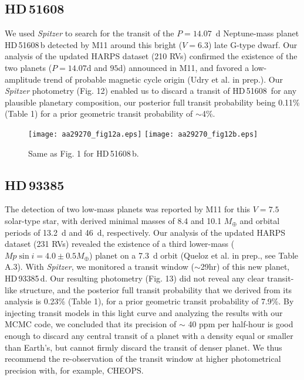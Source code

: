 \documentclass[traditabstract]{aa}
\begin{document}
\subsection{HD\,51608}

We used {\it Spitzer} to search for the transit of the $P=14.07$~d Neptune-mass planet HD\,51608\,b detected by M11
around this bright ($V=6.3$) late G-type dwarf. Our analysis of the updated HARPS dataset (210 RVs) confirmed the 
existence of the two planets ($P=14.07$d and $95$d) announced in M11, and favored a low-amplitude trend
of probable magnetic cycle origin (Udry et al. in prep.). Our {\it Spitzer} photometry (Fig. 12) enabled us to discard a 
transit of HD\,51608\, for any plausible planetary composition, our posterior full transit probability being 0.11\% (Table 1) for a
 prior geometric transit probability of $\sim$4\%.


\begin{figure}
\label{fig:13}
\centering                     
\texttt{[image: aa29270\_fig12a.eps]}
\texttt{[image: aa29270\_fig12b.eps]}
\caption{Same as Fig. 1 for  HD\,51608\,b.}
\end{figure}

\subsection{HD\,93385}

The detection of two low-mass planets was reported by M11 for this $V=7.5$ solar-type star, with derived minimal masses of 8.4 and 10.1 $M_\oplus$ and orbital periods of 13.2~d and 46~d, respectively. Our analysis of the updated HARPS dataset (231 RVs)  revealed the existence of a third lower-mass ($Mp\sin{i} = 4.0 \pm 0.5 M_\oplus$) planet  on a 7.3~d orbit (Queloz et al. in prep., see Table A.3).  With {\it Spitzer}, we monitored a transit window ($\sim$29hr) of this new planet, HD\,93385\,d. Our resulting photometry (Fig. 13) did not reveal any clear transit-like structure, and the posterior full transit probability that we derived from its analysis is 0.23\% (Table 1), for a prior geometric transit probability of 7.9\%. By injecting transit models in this light curve and analyzing the results with our MCMC code, we concluded that its precision of $\sim$ 40 ppm per half-hour is good enough to discard any central transit of a planet with a density equal or smaller than Earth's, but cannot firmly discard the transit of denser planet. We thus recommend the re-observation of the transit window at higher photometrical precision with, for example, CHEOPS.
 
\end{document}
